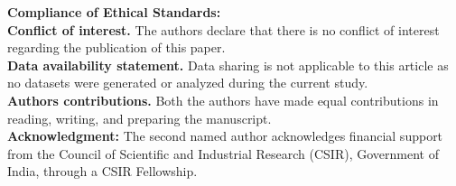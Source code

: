 \documentclass[a4paper,12pt,reqno]{amsart}
\numberwithin{equation}{section}
\begin{document}
	\noindent\textbf{Compliance of Ethical Standards:}\\[2mm]
	\noindent\textbf{Conflict of interest.} The authors declare that there is no conflict of interest regarding the publication of this paper.\\[1mm]
	\noindent\textbf{Data availability statement.} Data sharing is not applicable to this article as no datasets were generated or analyzed during the current study.\\[1mm]
	\noindent\textbf{Authors contributions.} Both the authors have made equal contributions in reading, writing, and preparing the manuscript.\\[1mm]
	\noindent\textbf{Acknowledgment:}
	The second named author acknowledges financial support from the Council of Scientific and Industrial Research (CSIR), Government of India, through a CSIR Fellowship.
	
	\bigskip
	
\end{document}
